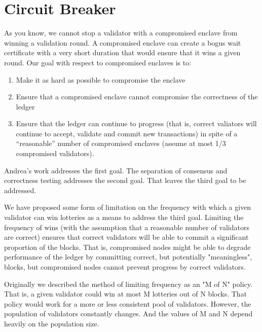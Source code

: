 \section{Circuit Breaker}
\label{sec_failure}

As you know, we cannot stop a validator with a compromised enclave from
winning a validation round. A compromised enclave can create a bogus
wait certificate with a very short duration that would ensure that it
wins a given round. Our goal with respect to compromised enclaves is to:

\begin{enumerate}
\item Make it as hard as possible to compromise the enclave
\item Ensure that a compromised enclave cannot compromise the
  correctness of the ledger
\item Ensure that the ledger can continue to progress (that is, correct
  valiators will continue to accept, validate and commit new
  transactions) in spite of a ``reasonable'' number of compromised enclaves
  (assume at most 1/3 compromised validators).
\end{enumerate}

Andrea's work addresses the first goal. The separation of
consensus and correctness testing addresses the second goal. That leaves
the third goal to be addressed.

We have proposed some form of limitation on the frequency with which a
given validator can win lotteries as a means to address the third
goal. Limiting the frequency of wins (with the assumption that a
reasonable number of validators are correct) ensures that correct
validators will be able to commit a significant proportion of the
blocks. That is, compromised nodes might be able to degrade performance
of the ledger by committing correct, but potentially "meaningless",
blocks, but compromised nodes cannot prevent progress by correct
validators.

Originally we described the method of limiting frequency as an "M of N"
policy. That is, a given validator could win at most M lotteries out of
N blocks. That policy would work for a more or less consistent pool of
validators. However, the population of validators constantly
changes. And the values of M and N depend heavily on the population
size.

